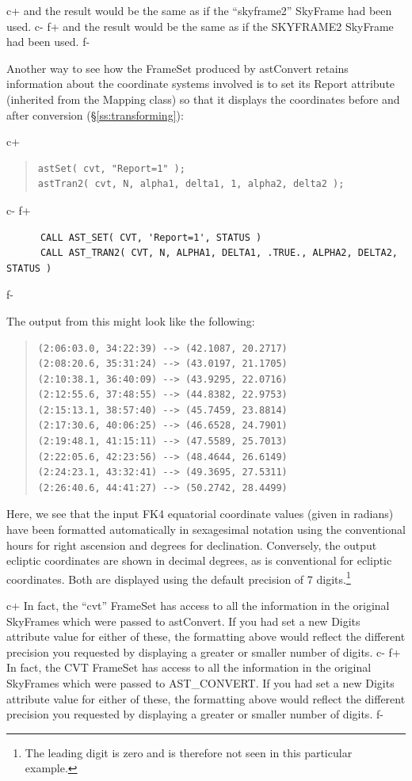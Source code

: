 \documentclass[twoside,11pt]{article}
\newcommand{\secref}[1]{\S\ref{#1}}
\newcommand{\secref}[1]{\ref{#1}}
\begin{document}
c+
and the result would be the same as if the ``skyframe2'' SkyFrame had
been used.
c-
f+
and the result would be the same as if the SKYFRAME2 SkyFrame had been
used.
f-

Another way to see how the FrameSet produced by astConvert retains
information about the coordinate systems involved is to set its Report
attribute (inherited from the Mapping class) so that it displays the
coordinates before and after conversion (\secref{ss:transforming}):

c+
\begin{quote}
\small
\begin{verbatim}
astSet( cvt, "Report=1" );
astTran2( cvt, N, alpha1, delta1, 1, alpha2, delta2 );
\end{verbatim}
\normalsize
\end{quote}
c-
f+
\small
\begin{verbatim}
      CALL AST_SET( CVT, 'Report=1', STATUS )
      CALL AST_TRAN2( CVT, N, ALPHA1, DELTA1, .TRUE., ALPHA2, DELTA2, STATUS )
\end{verbatim}
\normalsize
f-

The output from this might look like the following:

\begin{quote}
\begin{verbatim}
(2:06:03.0, 34:22:39) --> (42.1087, 20.2717)
(2:08:20.6, 35:31:24) --> (43.0197, 21.1705)
(2:10:38.1, 36:40:09) --> (43.9295, 22.0716)
(2:12:55.6, 37:48:55) --> (44.8382, 22.9753)
(2:15:13.1, 38:57:40) --> (45.7459, 23.8814)
(2:17:30.6, 40:06:25) --> (46.6528, 24.7901)
(2:19:48.1, 41:15:11) --> (47.5589, 25.7013)
(2:22:05.6, 42:23:56) --> (48.4644, 26.6149)
(2:24:23.1, 43:32:41) --> (49.3695, 27.5311)
(2:26:40.6, 44:41:27) --> (50.2742, 28.4499)
\end{verbatim}
\end{quote}

Here, we see that the input FK4 equatorial coordinate values (given in
radians) have been formatted automatically in sexagesimal notation
using the conventional hours for right ascension and degrees for
declination. Conversely, the output ecliptic coordinates are shown in
decimal degrees, as is conventional for ecliptic coordinates. Both are
displayed using the default precision of 7 digits.\footnote{The
leading digit is zero and is therefore not seen in this particular
example.}

c+
In fact, the ``cvt'' FrameSet has access to all the information in the
original SkyFrames which were passed to astConvert. If you had set a
new Digits attribute value for either of these, the formatting above
would reflect the different precision you requested by displaying a
greater or smaller number of digits.
c-
f+
In fact, the CVT FrameSet has access to all the information in the
original SkyFrames which were passed to AST\_CONVERT. If you had set a
new Digits attribute value for either of these, the formatting above
would reflect the different precision you requested by displaying a
greater or smaller number of digits.
f-
\end{document}
